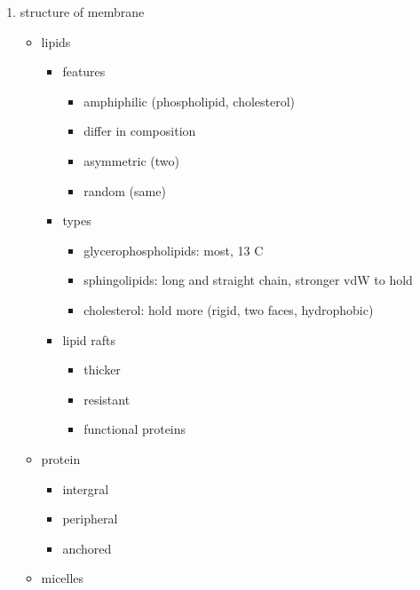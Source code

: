 \documentclass[]{article}
\begin{document}
\begin{enumerate}
  \begin{itemize}
  \item
  \end{itemize}
\item
  structure of membrane

  \begin{itemize}
  \item
    lipids

    \begin{itemize}
    \item
      features

      \begin{itemize}
      \item
        amphiphilic (phospholipid, cholesterol)
      \item
        differ in composition
      \item
        asymmetric (two)
      \item
        random (same)
      \end{itemize}
    \item
      types

      \begin{itemize}
      \item
        glycerophospholipids: most, 13 C
      \item
        sphingolipids: long and straight chain, stronger vdW to hold
      \item
        cholesterol: hold more (rigid, two faces, hydrophobic)
      \end{itemize}
    \item
      lipid rafts

      \begin{itemize}
      \item
        thicker
      \item
        resistant
      \item
        functional proteins
      \end{itemize}
    \end{itemize}
  \item
    protein

    \begin{itemize}
    \item
      intergral
    \item
      peripheral
    \item
      anchored
    \end{itemize}
  \item
    micelles


\end{itemize}
\end{enumerate}
\end{document}
